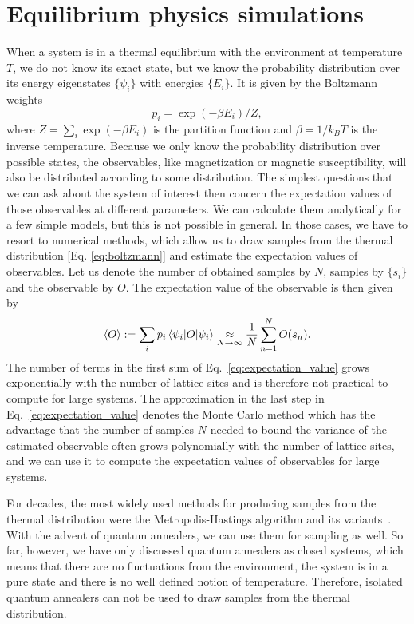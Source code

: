 \documentclass[12pt,a4paper]{article}
\newcommand{\avg}[1]{\left\langle#1\right\rangle}
\begin{document}
\section{Equilibrium physics simulations} \label{sec:equilibrium_simulations}
\hspace*{0.3cm}
When a system is in a thermal equilibrium with the environment at temperature $T$, we do not know its exact state,
but we know the probability distribution over its energy eigenstates $\{\psi_i\}$ with energies $\{E_i\}$.
It is given by the Boltzmann weights 
\begin{equation}
    p_i = \exp(- \beta E_i) / Z,
    \label{eq:boltzmann}
\end{equation}
where $Z = \sum_i \exp(-\beta E_i)$ is the partition function and $\beta = 1 / k_B T$
is the inverse temperature. Because we only know the probability distribution over possible states,
the observables, like magnetization or magnetic susceptibility, will also
be distributed according to some distribution. The simplest questions that we can ask about the system of interest
then concern the expectation values of those observables at different parameters.
We can calculate them analytically for a few simple models, but this is not possible in general.
In those cases, we have to resort to numerical methods, which allow us to draw samples from the thermal
distribution [Eq. \eqref{eq:boltzmann}] and estimate the expectation values of observables.
Let us denote the number of obtained samples by $N$, samples by $\{s_i\}$ and the observable by $O$.
The expectation value of the observable is then given by
\begin{equation}
    \avg{O} := \sum_i p_i \mel{\psi_i}{O}{\psi_i} \underset{N \to \infty}{\approx} \frac{1}{N} \sum_{n=1}^N O(s_n).
    \label{eq:expectation_value}
\end{equation}
The number of terms in the first sum of Eq.~\eqref{eq:expectation_value} grows exponentially with the
number of lattice sites and is therefore not practical to compute for large systems. The approximation
in the last step in Eq.~\eqref{eq:expectation_value} denotes the Monte Carlo method which has the advantage that the number of samples $N$ needed to bound
the variance of the estimated observable often grows polynomially with the number of lattice sites, and we can use it
to compute the expectation values of observables for large systems.

\hspace*{0.3cm}
For decades, the most widely used methods for producing samples from the thermal distribution were the
Metropolis-Hastings algorithm and its variants~\cite*{izquierdo2021testing}. With the advent of quantum annealers, we can
use them for sampling as well. So far, however, we have only discussed quantum annealers as closed systems,
which means that there are no fluctuations from the environment, the system is in a pure state and there is
no well defined notion of temperature. Therefore, isolated quantum annealers can not be used
to draw samples from the thermal distribution.
\end{document}
